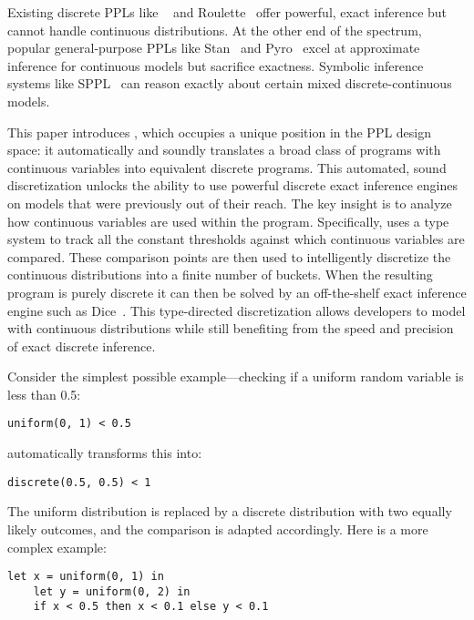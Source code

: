\documentclass[acmsmall,screen,dvipsnames,x11names,nonacm,anonymous,review]{acmart}
\begin{document}
Existing discrete PPLs like \Dice~\cite{Holtzen2020Dice} and Roulette~\cite{Moy2025Roulette} offer powerful, exact inference but cannot handle continuous distributions. At the other end of the spectrum, popular general-purpose PPLs like Stan~\cite{Carpenter2017Stan} and Pyro~\cite{Bingham2019Pyro} excel at approximate inference for continuous models but sacrifice exactness. Symbolic inference systems like SPPL~\cite{Saad2021SPPL} can reason exactly about certain mixed discrete-continuous models.

This paper introduces \Slice{}, which occupies a unique position in the PPL design space: it automatically and soundly translates a broad class of programs with continuous variables into equivalent discrete programs. This automated, sound discretization unlocks the ability to use powerful discrete exact inference engines on models that were previously out of their reach. The key insight is to analyze how continuous variables are used within the program. Specifically, \Slice{} uses a type system to track all the constant thresholds against which continuous variables are compared. These comparison points are then used to intelligently discretize the continuous distributions into a finite number of buckets. When the resulting program is purely discrete it can then be solved by an off-the-shelf exact inference engine such as Dice~\cite{Holtzen2020Dice}. This type-directed discretization allows developers to model with continuous distributions while still benefiting from the speed and precision of exact discrete inference.

Consider the simplest possible example---checking if a uniform random variable is less than 0.5:

\begin{lstlisting}[aboveskip=1em,belowskip=1em]
    uniform(0, 1) < 0.5
\end{lstlisting}

\noindent \Slice{} automatically transforms this into:

\begin{lstlisting}[aboveskip=1em,belowskip=1em]
    discrete(0.5, 0.5) < 1
\end{lstlisting}

\noindent The uniform distribution is replaced by a discrete distribution with two equally likely outcomes, and the comparison is adapted accordingly. Here is a more complex example:

\begin{lstlisting}[aboveskip=1em,belowskip=1em]
    let x = uniform(0, 1) in
    let y = uniform(0, 2) in
    if x < 0.5 then x < 0.1 else y < 0.1
\end{lstlisting}
\end{document}
